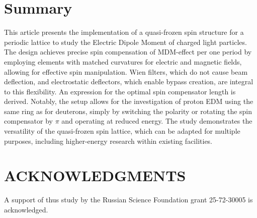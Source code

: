 \documentclass[submitting]{nst}
\begin{document}
\section{Summary} \label{sec.V}

\par This article presents the implementation of a quasi-frozen spin structure for a periodic lattice to study the Electric Dipole Moment of charged light particles. The design achieves precise spin compensation of MDM-effect per one period by employing elements with matched curvatures for electric and magnetic fields, allowing for effective spin manipulation. Wien filters, which do not cause beam deflection, and electrostatic deflectors, which enable bypass creation, are integral to this flexibility. An expression for the  optimal spin compensator length is derived. Notably, the setup allows for the investigation of proton EDM using the same ring as for deuterons, simply by switching the polarity or rotating the spin compensator by $\pi$ and operating at reduced energy. The study demonstrates the versatility of the quasi-frozen spin lattice, which can be adapted for multiple purposes, including higher-energy research within existing facilities.

\section*{ACKNOWLEDGMENTS}

\par A support of thus study by the Russian Science Foundation grant 25-72-30005 is acknowledged.
\end{document}
